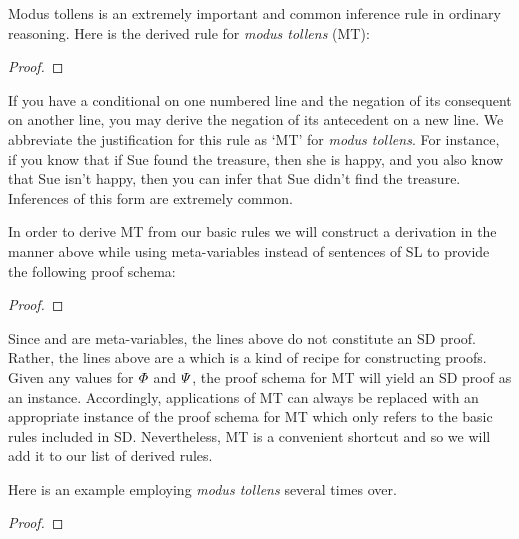 Modus tollens is an extremely important and common inference rule in ordinary reasoning.
Here is the derived rule for \textit{modus tollens} (MT):

\begin{proof}
	 
\end{proof}

If you have a conditional on one numbered line and the negation of its consequent on another line, you may derive the negation of its antecedent on a new line.
We abbreviate the justification for this rule as `MT' for \emph{modus tollens}.
For instance, if you know that if Sue found the treasure, then she is happy, and you also know that Sue isn't happy, then you can infer that Sue didn't find the treasure.
Inferences of this form are extremely common.

In order to derive MT from our basic rules we will construct a derivation in the manner above while using meta-variables instead of sentences of SL to provide the following proof schema:

\begin{proof}
	 \want{\enot \metaB{}}
	\open
		 
	\close
\end{proof}

Since \metaA{} and \metaB{} are meta-variables, the lines above do not constitute an SD proof.
Rather, the lines above are a  which is a kind of recipe for constructing proofs.
Given any values for $\varPhi$ and $\varPsi$, the proof schema for MT will yield an SD proof as an instance.
Accordingly, applications of MT can always be replaced with an appropriate instance of the proof schema for MT which only refers to the basic rules included in SD.
Nevertheless, MT is a convenient shortcut and so we will add it to our list of derived rules.

Here is an example employing \textit{modus tollens} several times over.

\begin{proof}
	 
	 
	 
	 
\end{proof}

